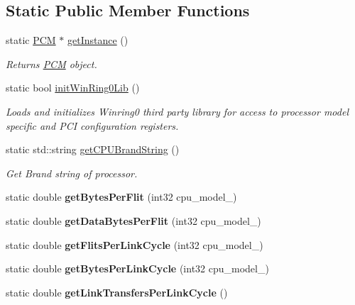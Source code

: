\subsection*{Static Public Member Functions}
\begin{DoxyCompactItemize}
\item 
static \mbox{\hyperlink{class_p_c_m}{P\+CM}} $\ast$ \mbox{\hyperlink{class_p_c_m_a155611028fb95409625e44784f7b4c7b}{get\+Instance}} ()
\begin{DoxyCompactList}\small\item\em Returns \mbox{\hyperlink{class_p_c_m}{P\+CM}} object. \end{DoxyCompactList}\item 
static bool \mbox{\hyperlink{class_p_c_m_a5e4cabfe4223f1d2e7e1e0da8b1179b3}{init\+Win\+Ring0\+Lib}} ()
\begin{DoxyCompactList}\small\item\em Loads and initializes Winring0 third party library for access to processor model specific and P\+CI configuration registers. \end{DoxyCompactList}\item 
\mbox{\label{class_p_c_m_a3279d88bbd5c2eab06c9c6cb6248c3c7}} 
static std\+::string \mbox{\hyperlink{class_p_c_m_a3279d88bbd5c2eab06c9c6cb6248c3c7}{get\+C\+P\+U\+Brand\+String}} ()
\begin{DoxyCompactList}\small\item\em Get Brand string of processor. \end{DoxyCompactList}\item 
\mbox{\label{class_p_c_m_aafe68963c6367e5cf69d7800b4ab4f16}} 
static double {\bfseries get\+Bytes\+Per\+Flit} (int32 cpu\+\_\+model\+\_\+)
\item 
\mbox{\label{class_p_c_m_a18864560cbdfe1b91d6a0157f34503df}} 
static double {\bfseries get\+Data\+Bytes\+Per\+Flit} (int32 cpu\+\_\+model\+\_\+)
\item 
\mbox{\label{class_p_c_m_ac403b42e61409ce5f0f630b41c5e2a32}} 
static double {\bfseries get\+Flits\+Per\+Link\+Cycle} (int32 cpu\+\_\+model\+\_\+)
\item 
\mbox{\label{class_p_c_m_a6b4130371367f0ab31b05828ee0c02a0}} 
static double {\bfseries get\+Bytes\+Per\+Link\+Cycle} (int32 cpu\+\_\+model\+\_\+)
\item 
\mbox{\label{class_p_c_m_a746b80c6942509dec884cbaabf663a74}} 
static double {\bfseries get\+Link\+Transfers\+Per\+Link\+Cycle} ()
\end{DoxyCompactItemize}
